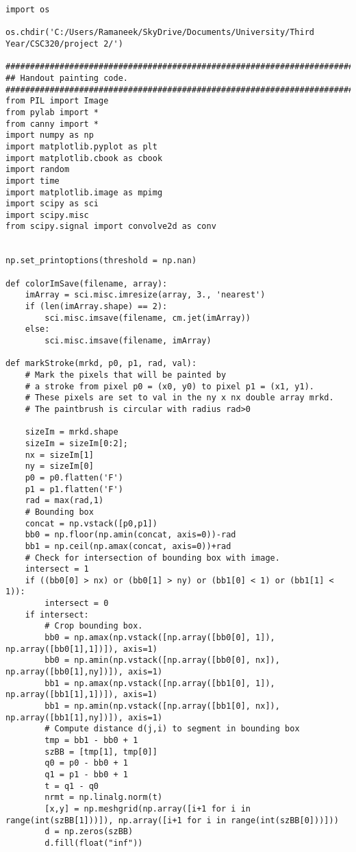\documentclass{article}
\begin{document}
\begin{lstlisting}
import os

os.chdir('C:/Users/Ramaneek/SkyDrive/Documents/University/Third Year/CSC320/project 2/')

###########################################################################
## Handout painting code.
###########################################################################
from PIL import Image
from pylab import *
from canny import *
import numpy as np
import matplotlib.pyplot as plt
import matplotlib.cbook as cbook
import random
import time
import matplotlib.image as mpimg
import scipy as sci
import scipy.misc
from scipy.signal import convolve2d as conv


np.set_printoptions(threshold = np.nan)  

def colorImSave(filename, array):
    imArray = sci.misc.imresize(array, 3., 'nearest')
    if (len(imArray.shape) == 2):
        sci.misc.imsave(filename, cm.jet(imArray))
    else:
        sci.misc.imsave(filename, imArray)

def markStroke(mrkd, p0, p1, rad, val):
    # Mark the pixels that will be painted by
    # a stroke from pixel p0 = (x0, y0) to pixel p1 = (x1, y1).
    # These pixels are set to val in the ny x nx double array mrkd.
    # The paintbrush is circular with radius rad>0
    
    sizeIm = mrkd.shape
    sizeIm = sizeIm[0:2];
    nx = sizeIm[1]
    ny = sizeIm[0]
    p0 = p0.flatten('F')
    p1 = p1.flatten('F')
    rad = max(rad,1)
    # Bounding box
    concat = np.vstack([p0,p1])
    bb0 = np.floor(np.amin(concat, axis=0))-rad
    bb1 = np.ceil(np.amax(concat, axis=0))+rad
    # Check for intersection of bounding box with image.
    intersect = 1
    if ((bb0[0] > nx) or (bb0[1] > ny) or (bb1[0] < 1) or (bb1[1] < 1)):
        intersect = 0
    if intersect:
        # Crop bounding box.
        bb0 = np.amax(np.vstack([np.array([bb0[0], 1]), np.array([bb0[1],1])]), axis=1)
        bb0 = np.amin(np.vstack([np.array([bb0[0], nx]), np.array([bb0[1],ny])]), axis=1)
        bb1 = np.amax(np.vstack([np.array([bb1[0], 1]), np.array([bb1[1],1])]), axis=1)
        bb1 = np.amin(np.vstack([np.array([bb1[0], nx]), np.array([bb1[1],ny])]), axis=1)
        # Compute distance d(j,i) to segment in bounding box
        tmp = bb1 - bb0 + 1
        szBB = [tmp[1], tmp[0]]
        q0 = p0 - bb0 + 1
        q1 = p1 - bb0 + 1
        t = q1 - q0
        nrmt = np.linalg.norm(t)
        [x,y] = np.meshgrid(np.array([i+1 for i in range(int(szBB[1]))]), np.array([i+1 for i in range(int(szBB[0]))]))
        d = np.zeros(szBB)
        d.fill(float("inf"))
        

\end{lstlisting}
\end{document}
